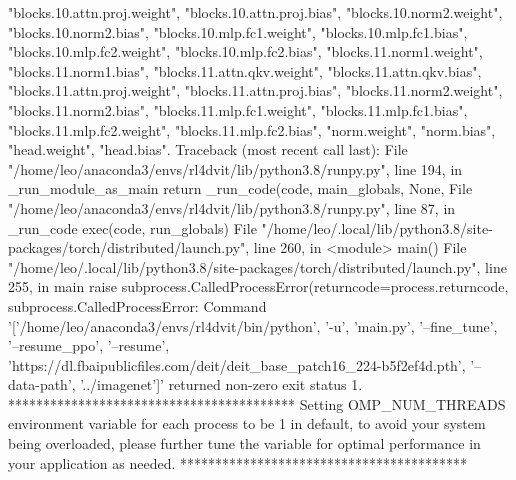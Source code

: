 "blocks.10.attn.proj.weight", "blocks.10.attn.proj.bias", "blocks.10.norm2.weight", "blocks.10.norm2.bias", "blocks.10.mlp.fc1.weight", "blocks.10.mlp.fc1.bias", "blocks.10.mlp.fc2.weight", "blocks.10.mlp.fc2.bias", "blocks.11.norm1.weight", "blocks.11.norm1.bias", "blocks.11.attn.qkv.weight", "blocks.11.attn.qkv.bias", "blocks.11.attn.proj.weight", "blocks.11.attn.proj.bias", "blocks.11.norm2.weight", "blocks.11.norm2.bias", "blocks.11.mlp.fc1.weight", "blocks.11.mlp.fc1.bias", "blocks.11.mlp.fc2.weight", "blocks.11.mlp.fc2.bias", "norm.weight", "norm.bias", "head.weight", "head.bias". 
Traceback (most recent call last):
  File "/home/leo/anaconda3/envs/rl4dvit/lib/python3.8/runpy.py", line 194, in _run_module_as_main
    return _run_code(code, main_globals, None,
  File "/home/leo/anaconda3/envs/rl4dvit/lib/python3.8/runpy.py", line 87, in _run_code
    exec(code, run_globals)
  File "/home/leo/.local/lib/python3.8/site-packages/torch/distributed/launch.py", line 260, in <module>
    main()
  File "/home/leo/.local/lib/python3.8/site-packages/torch/distributed/launch.py", line 255, in main
    raise subprocess.CalledProcessError(returncode=process.returncode,
subprocess.CalledProcessError: Command '['/home/leo/anaconda3/envs/rl4dvit/bin/python', '-u', 'main.py', '--fine_tune', '--resume_ppo', '--resume', 'https://dl.fbaipublicfiles.com/deit/deit_base_patch16_224-b5f2ef4d.pth', '--data-path', '../imagenet']' returned non-zero exit status 1.
*****************************************
Setting OMP_NUM_THREADS environment variable for each process to be 1 in default, to avoid your system being overloaded, please further tune the variable for optimal performance in your application as needed. 
*****************************************
